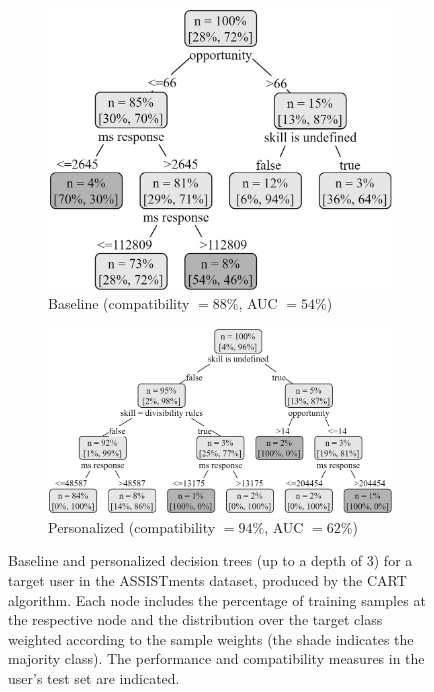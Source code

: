 \documentclass[letterpaper]{article} %
\theoremstyle{definition}
\begin{document}
\begin{figure}[t]
\begin{subfigure}[b]{.4\textwidth}
  \centering
  \includegraphics[width=0.95\linewidth]{assistments_baseline}
  \caption{Baseline (compatibility $=88\%$, AUC $=54\%$)}
  \label{fig:assistments_baseline}
\end{subfigure}
\begin{subfigure}[b]{.6\textwidth}
  \centering
  \includegraphics[width=0.95\linewidth]{assistments_personalized}
  \caption{Personalized (compatibility $=94\%$, AUC $=62\%$)}
  \label{fig:assistments_personalized}
\end{subfigure}
\caption{Baseline and personalized decision trees (up to a depth of 3) for a target user in the ASSISTments dataset,  produced by the CART algorithm.  Each node includes  the percentage of training samples at the respective node and the distribution over the target class weighted according to the sample weights (the shade indicates the majority class). The performance and compatibility measures in the user's test set are indicated.}
\label{fig:user_case_assistments}
\end{figure}
\end{document}
